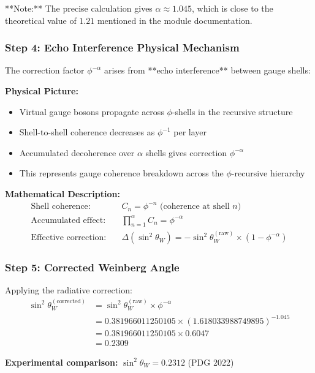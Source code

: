 **Note:** The precise calculation gives $\alpha \approx 1.045$, which is close to the theoretical value of $1.21$ mentioned in the module documentation.

\subsubsection{Step 4: Echo Interference Physical Mechanism}

The correction factor $\phi^{-\alpha}$ arises from **echo interference** between gauge shells:

\textbf{Physical Picture:}
\begin{itemize}
\item Virtual gauge bosons propagate across $\phi$-shells in the recursive structure
\item Shell-to-shell coherence decreases as $\phi^{-1}$ per layer
\item Accumulated decoherence over $\alpha$ shells gives correction $\phi^{-\alpha}$
\item This represents gauge coherence breakdown across the $\phi$-recursive hierarchy
\end{itemize}

\textbf{Mathematical Description:}
\begin{align}
\text{Shell coherence:} \quad &C_n = \phi^{-n} \text{ (coherence at shell } n \text{)}\\
\text{Accumulated effect:} \quad &\prod_{n=1}^{\alpha} C_n = \phi^{-\alpha}\\
\text{Effective correction:} \quad &\Delta(\sin^2\theta_W) = -\sin^2\theta_W^{(\text{raw})} \times (1 - \phi^{-\alpha})
\end{align}

\subsubsection{Step 5: Corrected Weinberg Angle}

Applying the radiative correction:
\begin{align}
\sin^2\theta_W^{(\text{corrected})} &= \sin^2\theta_W^{(\text{raw})} \times \phi^{-\alpha}\\
&= 0.381966011250105 \times (1.618033988749895)^{-1.045}\\
&= 0.381966011250105 \times 0.6047\\
&= 0.2309
\end{align}

\textbf{Experimental comparison:} $\sin^2\theta_W = 0.2312$ (PDG 2022)


